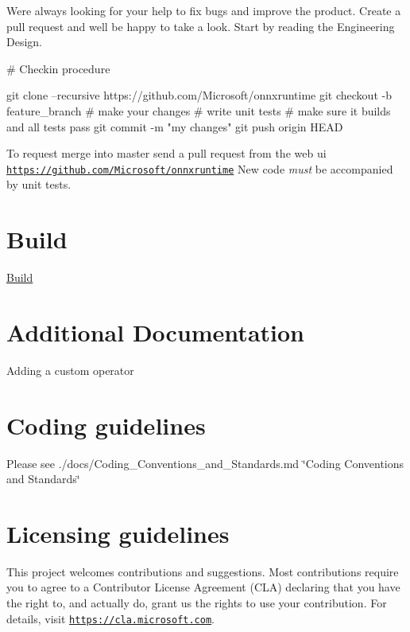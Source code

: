We\textquotesingle{}re always looking for your help to fix bugs and improve the product. Create a pull request and we\textquotesingle{}ll be happy to take a look. Start by reading the Engineering Design.

\# Checkin procedure 
\begin{DoxyCode}
git clone --recursive https://github.com/Microsoft/onnxruntime
git checkout -b feature\_branch
# make your changes
# write unit tests
# make sure it builds and all tests pass
git commit -m "my changes"
git push origin HEAD
\end{DoxyCode}
 To request merge into master send a pull request from the web ui \href{https://github.com/Microsoft/onnxruntime}{\tt https\+://github.\+com/\+Microsoft/onnxruntime} New code {\itshape must} be accompanied by unit tests.

\section*{Build}

\mbox{\hyperlink{BUILD_8md}{Build}}

\section*{Additional Documentation}


\begin{DoxyItemize}
\item Adding a custom operator
\end{DoxyItemize}

\section*{Coding guidelines}

Please see ./docs/\+Coding\+\_\+\+Conventions\+\_\+and\+\_\+\+Standards.md \char`\"{}\+Coding Conventions and Standards\char`\"{}

\section*{Licensing guidelines}

This project welcomes contributions and suggestions. Most contributions require you to agree to a Contributor License Agreement (C\+LA) declaring that you have the right to, and actually do, grant us the rights to use your contribution. For details, visit \href{https://cla.microsoft.com}{\tt https\+://cla.\+microsoft.\+com}.

